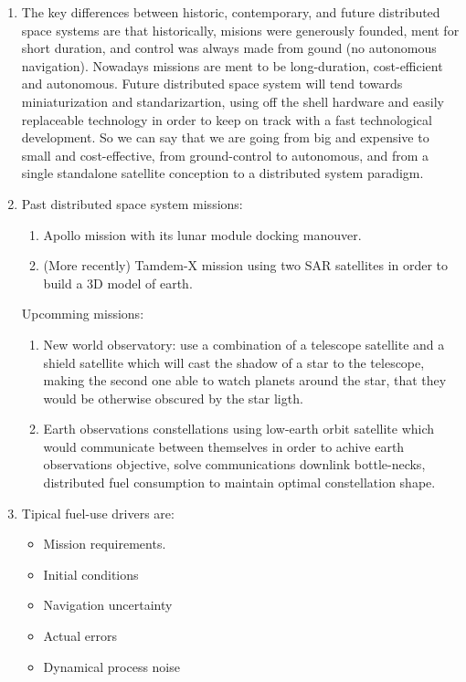 \documentclass[a4paper]{article}
\begin{document}
\begin{enumerate}[label=\emph{\alph*)},series=preguntas1_1]
  \item %
    The key differences between historic, contemporary, and future distributed space systems are that historically, misions were generously founded, ment for short duration, and control was always made from gound (no autonomous navigation). Nowadays missions are ment to be long-duration, cost-efficient and autonomous. Future distributed space system will tend towards miniaturization and standarizartion, using off the shell hardware and easily replaceable technology in order to keep on track with a fast technological development. So we can say that we are going from big and expensive to small and cost-effective, from ground-control to autonomous, and from a single standalone satellite conception to a distributed system paradigm.

  \item %
    Past distributed space system missions:
    \begin{enumerate}[label=\arabic*., series=pregunta4]
      \item Apollo mission with its lunar module docking manouver.
      \item (More recently) Tamdem-X mission using two SAR satellites in order to build a 3D model of earth.
    \end{enumerate}

    Upcomming missions:
    \begin{enumerate}[resume*=pregunta4]
      \item New world observatory: use a combination of a telescope satellite and a shield satellite which will cast the shadow of a star to the telescope, making the second one able to watch planets around the star, that they would be otherwise obscured by the star ligth.
      \item Earth observations constellations using low-earth orbit satellite which would communicate between themselves in order to achive earth observations objective, solve communications downlink bottle-necks, distributed fuel consumption to maintain optimal constellation shape.
    \end{enumerate}

  \item %
    Tipical fuel-use drivers are:
  \begin{itemize}
    \item Mission requirements.
    \item Initial conditions
    \item Navigation uncertainty
    \item Actual errors
    \item Dynamical process noise
  \end{itemize}


\end{enumerate}
\end{document}
